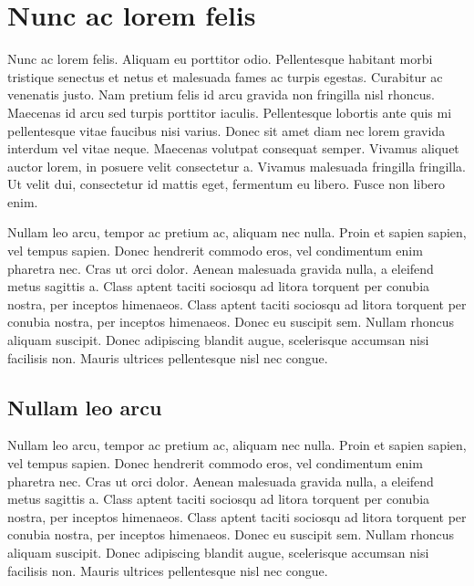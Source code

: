 
\chapter{Nunc ac lorem felis}
\label{app:api}

Nunc ac lorem felis. Aliquam eu porttitor odio. Pellentesque habitant morbi tristique senectus et netus et malesuada fames ac turpis egestas. Curabitur ac venenatis justo. Nam pretium felis id arcu gravida non fringilla nisl rhoncus. Maecenas id arcu sed turpis porttitor iaculis. Pellentesque lobortis ante quis mi pellentesque vitae faucibus nisi varius. Donec sit amet diam nec lorem gravida interdum vel vitae neque. Maecenas volutpat consequat semper. Vivamus aliquet auctor lorem, in posuere velit consectetur a. Vivamus malesuada fringilla fringilla. Ut velit dui, consectetur id mattis eget, fermentum eu libero. Fusce non libero enim.

Nullam leo arcu, tempor ac pretium ac, aliquam nec nulla. Proin et sapien sapien, vel tempus sapien. Donec hendrerit commodo eros, vel condimentum enim pharetra nec. Cras ut orci dolor. Aenean malesuada gravida nulla, a eleifend metus sagittis a. Class aptent taciti sociosqu ad litora torquent per conubia nostra, per inceptos himenaeos. Class aptent taciti sociosqu ad litora torquent per conubia nostra, per inceptos himenaeos. Donec eu suscipit sem. Nullam rhoncus aliquam suscipit. Donec adipiscing blandit augue, scelerisque accumsan nisi facilisis non. Mauris ultrices pellentesque nisl nec congue. 

\section{Nullam leo arcu}

Nullam leo arcu, tempor ac pretium ac, aliquam nec nulla. Proin et sapien sapien, vel tempus sapien. Donec hendrerit commodo eros, vel condimentum enim pharetra nec. Cras ut orci dolor. Aenean malesuada gravida nulla, a eleifend metus sagittis a. Class aptent taciti sociosqu ad litora torquent per conubia nostra, per inceptos himenaeos. Class aptent taciti sociosqu ad litora torquent per conubia nostra, per inceptos himenaeos. Donec eu suscipit sem. Nullam rhoncus aliquam suscipit. Donec adipiscing blandit augue, scelerisque accumsan nisi facilisis non. Mauris ultrices pellentesque nisl nec congue. 

